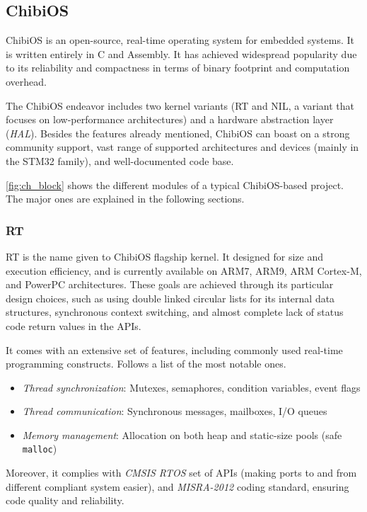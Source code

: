 \subsection{ChibiOS}
ChibiOS is an open-source, real-time operating system for embedded systems.
It is written entirely in C and Assembly.
It has achieved widespread popularity due to its reliability and compactness in terms of binary footprint and computation overhead.

The ChibiOS endeavor includes two kernel variants (RT and NIL, a variant that focuses on low-performance architectures) and a hardware abstraction layer (\emph{HAL}).
Besides the features already mentioned, ChibiOS can boast on a strong community support, vast range of supported architectures and devices (mainly in the STM32 family), and well-documented code base.

\ref{fig:ch_block} shows the different modules of a typical ChibiOS-based project.
The major ones are explained in the following sections.



\subsubsection{RT}
RT is the name given to ChibiOS flagship kernel.
It designed for size and execution efficiency, and is currently available on ARM7, ARM9, ARM Cortex-M, and PowerPC architectures.
These goals are achieved through its particular design choices, such as using double linked circular lists for its internal data structures, synchronous context switching, and almost complete lack of status code return values in the APIs.

It comes with an extensive set of features, including commonly used real-time programming constructs.
Follows a list of the most notable ones.
\begin{itemize}
    \item \emph{Thread synchronization}: Mutexes, semaphores, condition variables, event flags
    \item \emph{Thread communication}: Synchronous messages, mailboxes, I/O queues
    \item \emph{Memory management}: Allocation on both heap and static-size pools (safe \texttt{malloc})
\end{itemize}

Moreover, it complies with \emph{CMSIS RTOS} set of APIs (making ports to and from different compliant system easier), and \emph{MISRA-2012} coding standard, ensuring code quality and reliability.

